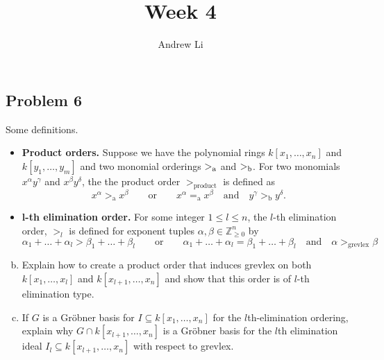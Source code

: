 \documentclass{homework}
\title{Week 4}
\author{Andrew Li}
\begin{document}
    \maketitle
    
    \setcounter{section}{3}
    \setcounter{subsection}{0}
    \subsection{Problem 6}
    Some definitions.
    \begin{itemize}
        \item \textbf{Product orders.} Suppose we have the polynomial rings $k[x_1, \dots, x_n]$ and  $k[y_1, \dots, y_m]$ and two monomial orderings $>_{\textrm a}$ and $>_{\textrm b}$. For two monomials $x^\alpha y^\gamma$ and $x^\beta y^\delta$, the the product order $>_{\textrm{product}}$ is defined as
        \[x^\alpha >_{\textrm{a}} x^\beta \quad\quad\text{or}\quad\quad x^\alpha =_{\textrm{a}} x^\beta \quad\text{and}\quad y^\gamma >_{\textrm{b}} y^\delta.\]
        \item $\bm{l}$\textbf{-th elimination order.} For some integer $1 \leq l \leq n$, the $l$-th elimination order, $>_l$ is defined for exponent tuples $\alpha, \beta \in \mathbb Z_{\geq 0}^n$ by
        \[\alpha_1 + \dots + \alpha_l > \beta_1 + \dots + \beta_l \quad\quad\text{or}\quad\quad \alpha_1 + \dots + \alpha_l = \beta_1 + \dots + \beta_l \quad\text{and}\quad \alpha >_{\textrm{grevlex}} \beta\]
    \end{itemize}
    
    \begin{enumerate}[(a)]
        \setcounter{enumi}{1}
        \item Explain how to create a product order that induces grevlex on both $k[x_1, \dots, x_l]$ and $k[x_{l+1}, \dots, x_n]$ and show that this order is of $l$-th elimination type.
        \item If $G$ is a Gr\"obner basis for $I \subseteq k[x_1, \dots, x_n]$ for the $l$th-elimination ordering, explain why $G \cap k[x_{l+1}, \dots, x_n]$ is a Gr\"obner basis for the $l$th elimination ideal $I_l \subseteq k[x_{l+1}, \dots, x_n]$ with respect to grevlex.
    \end{enumerate}
    
\end{document}
